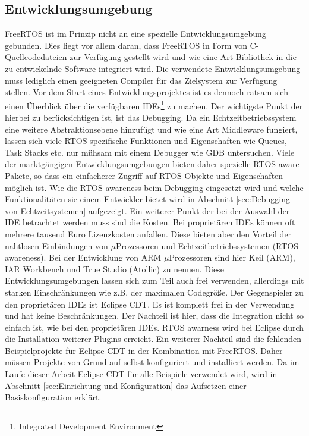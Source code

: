 \subsection{Entwicklungsumgebung}
\label{ref:Entwicklungsumgebung}
FreeRTOS ist im Prinzip nicht an eine spezielle Entwicklungsumgebung gebunden. Dies liegt vor allem daran, dass FreeRTOS in Form von C-Quellcodedateien zur Verfügung gestellt wird und wie eine Art Bibliothek in die zu entwickelnde Software integriert wird. Die verwendete Entwicklungsumgebung muss lediglich einen geeigneten Compiler für das Zielsystem zur Verfügung stellen. Vor dem Start eines Entwicklungsprojektes ist es dennoch ratsam sich einen Überblick über die ver\-fügbaren IDEs\footnote{Integrated Development Environment} zu machen. Der wichtigste Punkt der hierbei zu berücksichtigen ist, ist das Debugging. Da ein Echtzeitbetriebssystem eine weitere Abstraktionsebene hinzufügt und wie eine Art Middleware fungiert, lassen sich viele RTOS spezifische Funktionen und Eigenschaften wie Queues, Task Stacks etc. nur mühsam mit einem Debugger wie GDB untersuchen. Viele der markt\-gäng\-igen Entwicklungsumgebungen bieten daher spezielle RTOS-aware Pakete, so dass ein einfacherer Zugriff auf RTOS Objekte und Eigenschaften möglich ist. Wie die RTOS awareness beim Debugging eingesetzt wird und welche Funktionalitäten sie einem Entwickler bietet wird in Abschnitt \ref{sec:Debugging von Echtzeitsystemen} aufgezeigt. Ein weiterer Punkt der bei der Auswahl der IDE betrachtet werden muss sind die Kosten. Bei proprietären IDEs können oft mehrere tausend Euro Lizenzkosten anfallen. Diese bieten aber den Vorteil der nahtlosen Einbindungen von $\mu$Prozessoren und Echtzeitbetriebssystemen (RTOS\- aware\-ness). Bei der Entwicklung von ARM $\mu$\-Prozessoren sind hier Keil (ARM), IAR Workbench und True Studio (Atollic) zu nennen. Diese Entwicklungsumgebungen lassen sich zum Teil auch frei verwenden, allerdings mit starken Einschränkungen wie z.B. der maximalen Codegröße. Der Gegenspieler zu den proprietären IDEs ist Eclipse CDT. Es ist komplett frei in der Verwendung und hat keine Beschränkungen. Der Nachteil ist hier, dass die Integration nicht so einfach ist, wie bei den proprietären IDEs. RTOS awarness wird bei Eclipse durch die Installation weiterer Plugins erreicht. Ein weiterer Nachteil sind die fehlenden Beispielprojekte für Eclipse CDT in der Kombination mit FreeRTOS. Daher müssen Projekte von Grund auf selbst konfiguriert und installiert werden. Da im Laufe dieser Arbeit Eclipse CDT für alle Beispiele verwendet wird, wird in Abschnitt \ref{sec:Einrichtung und Konfiguration} das Aufsetzen einer Basiskonfiguration erklärt.